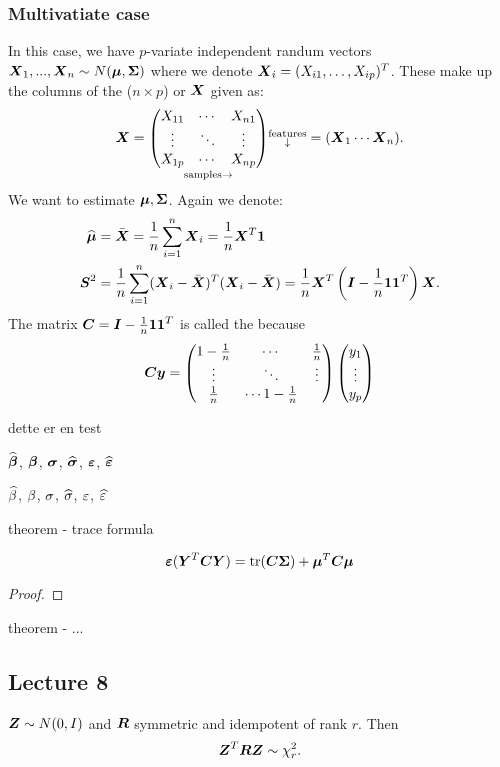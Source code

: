 \subsubsection{Multivatiate case}
In this case, we have $p$-variate independent randum vectors $\X_1,...,\X_n \sim N(\M, \SS)$ where we denote $\X_i=(X_{i1},\dots,X_{ip})^T$. These make up the columns of the ($n\times p$)  or  $\X$ given as:
$$
    \X = 
    \underset{\mr{samples} \rightarrow}{
    \begin{pmatrix}
        X_{11} & \cdots & X_{n1} \\
        \vdots & \ddots & \vdots \\
        X_{1p} & \cdots & X_{np}
    \end{pmatrix}}
    \substack{\text{features} \\ \downarrow}
    = (\X_1 \cdots \X_n).
$$
We want to estimate $\M, \SS$. Again we denote:
\begin{align*}
    \Mh &= \bar{\X} = \frac{1}{n} \sum_{i=1}^n \X_i = \frac{1}{n}\X^T \one \\
    \bs{S}^2 
    &= \frac{1}{n} \sum_{i=1}^n (\X_i-\bar{\X})^T(\X_i-\bar{\X}) 
    = \frac{1}{n} \X^T\brac{\mI-\frac{1}{n} \one\one^T}\X.
\end{align*}
The matrix $\mC=\mI-\frac{1}{n} \one\one^T$ is called the  because
$$
    \mC \y = \begin{pmatrix}
        1-\frac{1}{n} & \cdots & \frac{1}{n} \\
        \vdots & \ddots & \vdots \\
        \frac{1}{n} & \cdots 1-\frac{1}{n}
    \end{pmatrix}
    \begin{pmatrix}
        y_1 \\ \vdots \\ y_p
    \end{pmatrix}
$$








dette er en test

$\Bh$, $\B$, $\S$, $\Sh$, $\E$, $\Eh$

$\bh$, $\b$, $\s$, $\sh$, $\e$, $\eh$


theorem - trace formula 
\begin{theorem} 
    $$
        \E(\Y^T\bs{C}\Y) = \mr{tr}(\bs{C\Sigma}) + \M^T\bs{C}\M
    $$    
\end{theorem}
\begin{proof}
    \TODO{}
\end{proof}

theorem - ...


\subsection*{Lecture 8}

\begin{theorem}
    $\bs{Z}\sim N(0, I)$ and $\bs{R}$ symmetric and idempotent of rank $r$. Then 
    $$
        \bs{Z}^T \bs{R} \bs{Z} \sim \chi^2_r.
    $$
\end{theorem}